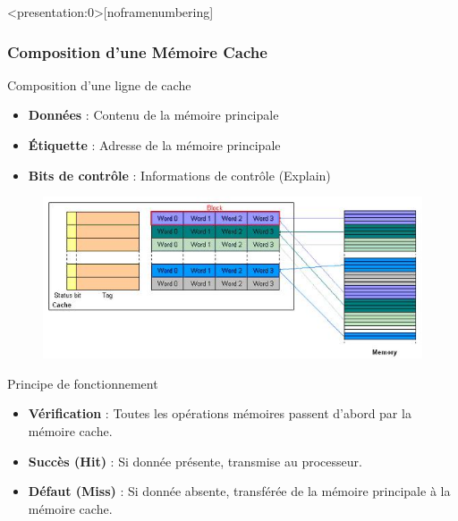 \documentclass[8pt]{beamer}
\begin{document}
\begin{frame}<presentation:0>[noframenumbering]
    \frametitle{Composition d'une Mémoire Cache}
    \begin{block}{Composition d'une ligne de cache}
        \begin{itemize}
            \item \textbf{Données} : Contenu de la mémoire principale
            \item \textbf{Étiquette} : Adresse de la mémoire principale
            \item \textbf{Bits de contrôle} : Informations de contrôle
                  (Explain)
        \end{itemize}
    \end{block}
    \begin{figure}
        \centering
        \includegraphics[width=.5\textwidth]{figures/Direct_mapped_cache.JPG}
    \end{figure}
    \vspace*{-.5cm}
    \begin{block}{Principe de fonctionnement}
        \begin{itemize}
            \item \textbf{Vérification} : Toutes les opérations mémoires
                  passent d'abord par la mémoire cache.
            \item \textbf{Succès (Hit)} : Si donnée présente, transmise
                  au processeur.
            \item \textbf{Défaut (Miss)} : Si donnée absente, transférée
                  de la mémoire principale à la mémoire cache.
        \end{itemize}
    \end{block}
\end{frame}
\end{document}
